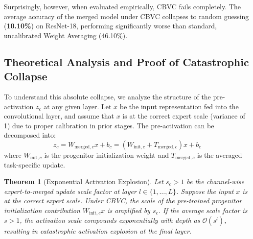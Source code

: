 \documentclass{article}
\newtheorem{theorem}{Theorem}
\begin{document}
Surprisingly, however, when evaluated empirically, CBVC fails completely. The average accuracy of the merged model under CBVC collapses to random guessing (\textbf{10.10\%}) on ResNet-18, performing significantly worse than standard, uncalibrated Weight Averaging (46.10\%).

\subsection{Theoretical Analysis and Proof of Catastrophic Collapse}
To understand this absolute collapse, we analyze the structure of the pre-activation $z_c$ at any given layer. Let $x$ be the input representation fed into the convolutional layer, and assume that $x$ is at the correct expert scale (variance of 1) due to proper calibration in prior stages. The pre-activation can be decomposed into:
\begin{equation}
    z_c = W_{\text{merged}, c} x + b_c = \left(W_{\text{init}, c} + T_{\text{merged}, c}\right) x + b_c
\end{equation}
where $W_{\text{init}, c}$ is the progenitor initialization weight and $T_{\text{merged}, c}$ is the averaged task-specific update.

\begin{theorem}[Exponential Activation Explosion]
Let $s_c > 1$ be the channel-wise expert-to-merged update scale factor at layer $l \in \{1,\dots,L\}$. Suppose the input $x$ is at the correct expert scale. Under CBVC, the scale of the pre-trained progenitor initialization contribution $W_{\text{init}, c} x$ is amplified by $s_c$. If the average scale factor is $s > 1$, the activation scale compounds exponentially with depth as $\mathcal{O}(s^l)$, resulting in catastrophic activation explosion at the final layer.
\end{theorem}
\end{document}
